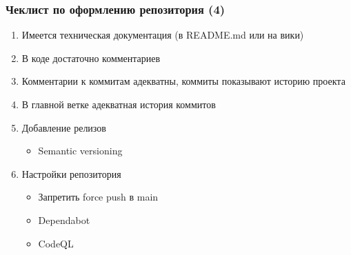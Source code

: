 \documentclass{../../slides-style}
\begin{document}
    \begin{frame}
        \frametitle{Чеклист по оформлению репозитория (4)}
        \begin{enumerate}
            \item Имеется техническая документация (в README.md или на вики)
            \item В коде достаточно комментариев
            \item Комментарии к коммитам адекватны, коммиты показывают историю проекта
            \item В главной ветке адекватная история коммитов
            \item Добавление релизов
            \begin{itemize}
                \item Semantic versioning
            \end{itemize}
            \item Настройки репозитория
            \begin{itemize}
                \item Запретить force push в main
                \item Dependabot
                \item CodeQL
            \end{itemize}
        \end{enumerate}
    \end{frame}
\end{document}
